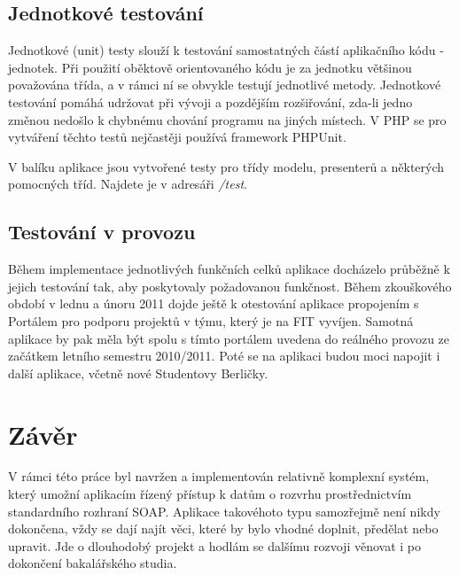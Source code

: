 \documentclass[11pt,twoside,a4paper]{book}
\begin{document}
\section{Jednotkové testování}
Jednotkové (unit) testy slouží k testování samostatných částí aplikačního kódu - jednotek. Při použití oběktově orientovaného kódu je za jednotku většinou považována třída, a v rámci ní se obvykle testují jednotlivé metody. Jednotkové testování pomáhá udržovat při vývoji a pozdějším rozšiřování, zda-li jedno změnou nedošlo k chybnému chování programu na jiných místech. V PHP se pro vytváření těchto testů nejčastěji používá framework PHPUnit\cite{phpunit}.

V balíku aplikace jsou vytvořené testy pro třídy modelu, presenterů a některých pomocných tříd. Najdete je v adresáři \textit{/test}.

\section{Testování v provozu}

Během implementace jednotlivých funkčních celků aplikace docházelo průběžně k jejich testování tak, aby poskytovaly požadovanou funkčnost. Během zkouškového období v lednu a únoru 2011 dojde ještě k otestování aplikace propojením s Portálem pro podporu projektů v týmu, který je na FIT vyvíjen. Samotná aplikace by pak měla být spolu s tímto portálem uvedena do reálného provozu ze začátkem letního semestru 2010/2011. Poté se na aplikaci budou moci napojit i další aplikace, včetně nové Studentovy Berličky.

\chapter{Závěr}
V rámci této práce byl navržen a implementován relativně komplexní systém, který umožní aplikacím řízený přístup k datům o rozvrhu prostřednictvím standardního rozhraní SOAP. Aplikace takovéhoto typu samozřejmě není nikdy dokončena, vždy se dají najít věci, které by bylo vhodné doplnit, předělat nebo upravit. Jde o dlouhodobý projekt a hodlám se dalšímu rozvoji věnovat i po dokončení bakalářského studia.
\end{document}
